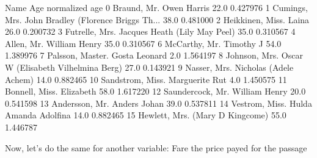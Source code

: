 \documentclass[letterpaper,10pt,english]{jupyterBook}
\begin{document}
\begin{sphinxVerbatim}[commandchars=\\\{\}]
                                                 Name   Age  normalized age
0                             Braund, Mr. Owen Harris  22.0       \PYGZhy{}0.427976
1   Cumings, Mrs. John Bradley (Florence Briggs Th...  38.0        0.481000
2                              Heikkinen, Miss. Laina  26.0       \PYGZhy{}0.200732
3        Futrelle, Mrs. Jacques Heath (Lily May Peel)  35.0        0.310567
4                            Allen, Mr. William Henry  35.0        0.310567
6                             McCarthy, Mr. Timothy J  54.0        1.389976
7                      Palsson, Master. Gosta Leonard   2.0       \PYGZhy{}1.564197
8   Johnson, Mrs. Oscar W (Elisabeth Vilhelmina Berg)  27.0       \PYGZhy{}0.143921
9                 Nasser, Mrs. Nicholas (Adele Achem)  14.0       \PYGZhy{}0.882465
10                    Sandstrom, Miss. Marguerite Rut   4.0       \PYGZhy{}1.450575
11                           Bonnell, Miss. Elizabeth  58.0        1.617220
12                     Saundercock, Mr. William Henry  20.0       \PYGZhy{}0.541598
13                        Andersson, Mr. Anders Johan  39.0        0.537811
14               Vestrom, Miss. Hulda Amanda Adolfina  14.0       \PYGZhy{}0.882465
15                   Hewlett, Mrs. (Mary D Kingcome)   55.0        1.446787
\end{sphinxVerbatim}

\sphinxAtStartPar
Now, let’s do the same for another variable: Fare \sphinxhyphen{} the price payed for the passage
\end{document}
